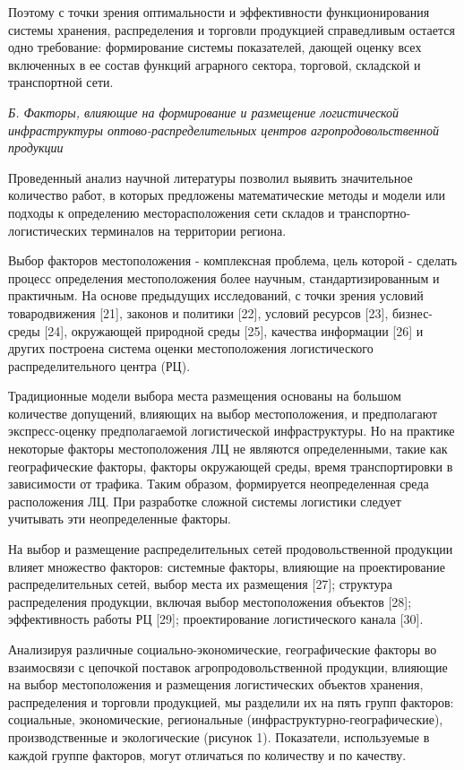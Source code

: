 Поэтому с точки зрения оптимальности и эффективности функционирования
системы хранения, распределения и торговли продукцией справедливым
остается одно требование: формирование системы показателей, дающей
оценку всех включенных в ее состав функций аграрного сектора, торговой,
складской и транспортной сети.

\emph{Б. Факторы, влияющие на формирование и размещение логистической
инфраструктуры оптово-распределительных центров агропродовольственной
продукции}

Проведенный анализ научной литературы позволил выявить значительное
количество работ, в которых предложены математические методы и модели
или подходы к определению месторасположения сети складов и
транспортно-логистических терминалов на территории региона.

Выбор факторов местоположения - комплексная проблема, цель которой -
сделать процесс определения местоположения более научным,
стандартизированным и практичным. На основе предыдущих исследований, с
точки зрения условий товародвижения {[}21{]}, законов и политики
{[}22{]}, условий ресурсов {[}23{]}, бизнес-среды {[}24{]}, окружающей
природной среды {[}25{]}, качества информации {[}26{]} и других
построена система оценки местоположения логистического
распределительного центра (РЦ).

Традиционные модели выбора места размещения основаны на большом
количестве допущений, влияющих на выбор местоположения, и предполагают
экспресс-оценку предполагаемой логистической инфраструктуры. Но на
практике некоторые факторы местоположения ЛЦ не являются определенными,
такие как географические факторы, факторы окружающей среды, время
транспортировки в зависимости от трафика. Таким образом, формируется
неопределенная среда расположения ЛЦ. При разработке сложной системы
логистики следует учитывать эти неопределенные факторы.

На выбор и размещение распределительных сетей продовольственной
продукции влияет множество факторов: системные факторы, влияющие на
проектирование распределительных сетей, выбор места их размещения
{[}27{]}; структура распределения продукции, включая выбор
местоположения объектов {[}28{]}; эффективность работы РЦ {[}29{]};
проектирование логистического канала {[}30{]}.

Анализируя различные социально-экономические, географические факторы во
взаимосвязи с цепочкой поставок агропродовольственной продукции,
влияющие на выбор местоположения и размещения логистических объектов
хранения, распределения и торговли продукцией, мы разделили их на пять
групп факторов: социальные, экономические, региональные
(инфраструктурно-географические), производственные и экологические
(рисунок 1). Показатели, используемые в каждой группе факторов, могут
отличаться по количеству и по качеству.

